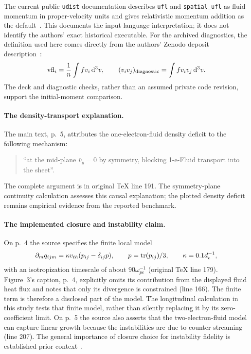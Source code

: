 The current public \texttt{udist} documentation describes \texttt{ufl} and
\texttt{spatial\_ufl} as fluid momentum in proper-velocity units and gives
relativistic momentum addition as the default~\cite{osirisudist}. This documents
the input-language interpretation; it does not identify the authors' exact
historical executable. For the archived diagnostics, the definition used here
comes directly from the authors' Zenodo deposit description~\cite{dataset}:
\[
 \mathrm{vfl}_i=\frac1n\int f v_i\,\mathrm d^3v,
 \qquad
 (v_i v_j)_{\rm diagnostic}=\int f v_i v_j\,\mathrm d^3v.
\]
The deck and diagnostic checks, rather than an assumed private code revision,
support the initial-moment comparison.

\paragraph{The density-transport explanation.}
The main text, p.~5, attributes the one-electron-fluid density deficit to the
following mechanism:
\begin{quote}\small
``at the mid-plane $\overline v_y=0$ by symmetry, blocking 1-e-Fluid transport
into the sheet''.
\end{quote}
The complete argument is in original TeX line 191. The symmetry-plane
continuity calculation assesses this causal explanation; the plotted density
deficit remains empirical evidence from the reported benchmark.

\paragraph{The implemented closure and instability claim.}
On p.~4 the source specifies the finite local model
\[
 \partial_m q_{ijm}=\kappa v_{th}(p_{ij}-\delta_{ij}p),
 \qquad p=\operatorname{tr}(p_{ij})/3,\qquad \kappa=0.1d_e^{-1},
\]
with an isotropization timescale of about $90\omega_{pe}^{-1}$
(original TeX line 179). Figure~3's caption, p.~4, explicitly omits its
contribution from the displayed fluid heat flux and notes that only its
divergence is constrained (line 166). The finite term is therefore a disclosed
part of the model. The longitudinal calculation in this study tests that
finite model, rather than silently replacing it by its zero-coefficient limit.
On p.~5 the source also asserts that the two-electron-fluid model can capture
linear growth because the instabilities are due to counter-streaming
(line 207). The general importance of closure choice for instability fidelity
is established prior context~\cite{ng2019}.

